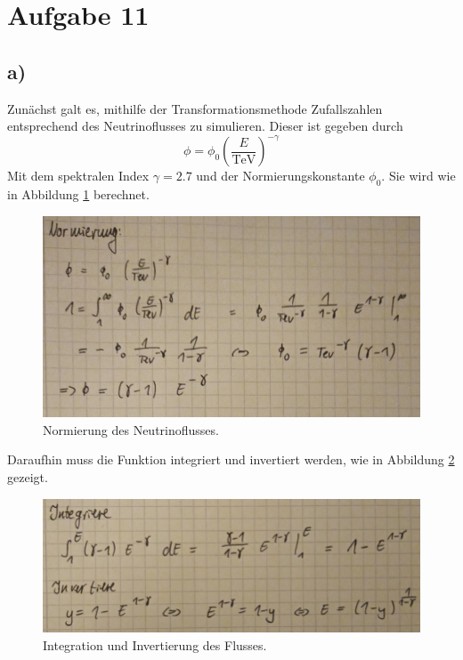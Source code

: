 \section{Aufgabe 11}
\subsection{a) }
    Zunächst galt es, mithilfe der Transformationsmethode Zufallszahlen
    entsprechend des Neutrinoflusses zu simulieren. Dieser ist gegeben
    durch
    \begin{equation*}
        \phi = \phi_0 \left( \frac{E}{\text{TeV}}\right)^{- \gamma}
    \end{equation*}
    Mit dem spektralen Index $\gamma = 2.7$ und der Normierungskonstante 
    $\phi_0$. Sie wird wie in Abbildung \ref{fig:norm} berechnet.

    \begin{figure}
        \centering
        \includegraphics[width=\textwidth]{norm.png}
        \caption{Normierung des Neutrinoflusses.}
        \label{fig:norm}
    \end{figure}
    \FloatBarrier

    \noindent Daraufhin muss die Funktion integriert und invertiert werden,
    wie in Abbildung \ref{fig:inv} gezeigt.

    \begin{figure}
        \centering
        \includegraphics[width=\textwidth]{inv.png}
        \caption{Integration und Invertierung des Flusses.}
        \label{fig:inv}
    \end{figure}
    \FloatBarrier

